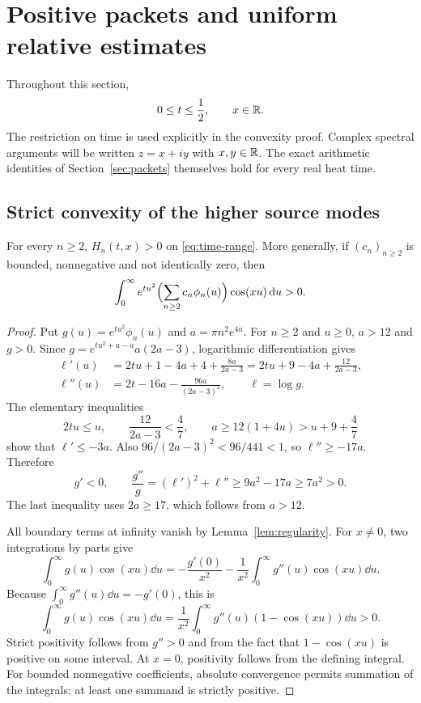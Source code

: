 \section{Positive packets and uniform relative estimates}\label{sec:positivity}

Throughout this section,
\begin{equation}\label{eq:time-range}
 0\le t\le\frac12,\qquad x\in\mathbb R.
\end{equation}
The restriction on time is used explicitly in the convexity proof.
Complex spectral arguments will be written $z=x+iy$ with $x,y\in\mathbb R$.
The exact arithmetic identities of Section~\ref{sec:packets} themselves
hold for every real heat time.

\subsection{Strict convexity of the higher source modes}

\begin{theorem}\label{thm:positive}
For every $n\ge2$, $H_n(t,x)>0$ on \eqref{eq:time-range}.
More generally, if $(c_n)_{n\ge2}$ is bounded, nonnegative and not identically
zero, then
\[
 \int_0^\infty e^{tu^2}\Bigl(\sum_{n\ge2}c_n\phi_n(u)\Bigr)
                  \cos(xu)\,\mathrm d u>0.
\]
\end{theorem}
\begin{proof}
Put $g(u)=e^{tu^2}\phi_n(u)$ and $a=\pi n^2e^{4u}$. For $n\ge2$ and
$u\ge0$, $a>12$ and $g>0$. Since
$g=e^{tu^2+u-a}a(2a-3)$, logarithmic differentiation gives
\begin{align}
 \ell'(u)&=2tu+1-4a+4+\frac{8a}{2a-3}
          =2tu+9-4a+\frac{12}{2a-3},\label{eq:log-first}\\
 \ell''(u)&=2t-16a-\frac{96a}{(2a-3)^2},
 \qquad \ell=\log g.\label{eq:log-second}
\end{align}
The elementary inequalities
\[
 2tu\le u,\qquad \frac{12}{2a-3}<\frac47,\qquad
 a\ge12(1+4u)>u+9+\frac47
\]
show that $\ell'\le-3a$. Also
$96/(2a-3)^2<96/441<1$, so $\ell''\ge-17a$. Therefore
\begin{equation}\label{eq:convexity}
 g'<0,\qquad
 \frac{g''}{g}=(\ell')^2+\ell''
 \ge9a^2-17a\ge7a^2>0.
\end{equation}
The last inequality uses $2a\ge17$, which follows from $a>12$.

All boundary terms at infinity vanish by Lemma~\ref{lem:regularity}.
For $x\ne0$, two integrations by parts give
\[
 \int_0^\infty g(u)\cos(xu)\dd u
 =-\frac{g'(0)}{x^2}
  -\frac1{x^2}\int_0^\infty g''(u)\cos(xu)\dd u.
\]
Because $\int_0^\infty g''(u)\dd u=-g'(0)$, this is
\begin{equation}\label{eq:positive-integral}
 \boxed{\int_0^\infty g(u)\cos(xu)\dd u
 =\frac1{x^2}\int_0^\infty g''(u)(1-\cos(xu))\dd u>0.}
\end{equation}
Strict positivity follows from $g''>0$ and from the fact that
$1-\cos(xu)$ is positive on some interval. At $x=0$, positivity follows
from the defining integral. For bounded nonnegative coefficients, absolute
convergence permits summation of the integrals; at least one summand is
strictly positive.
\end{proof}

